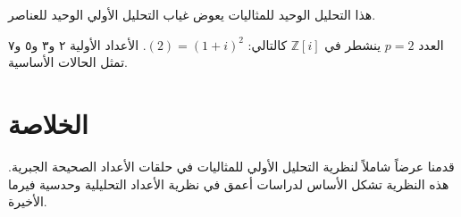 \documentclass{article}
\begin{document}
هذا التحليل الوحيد للمثاليات يعوض غياب التحليل الأولي الوحيد للعناصر.

العدد $p = 2$ ينشطر في $\mathbb{Z}[i]$ كالتالي: $(2) = (1+i)^2$.
الأعداد الأولية ٢ و٣ و٥ و٧ تمثل الحالات الأساسية.

\section{الخلاصة}

قدمنا عرضاً شاملاً لنظرية التحليل الأولي للمثاليات في حلقات الأعداد
الصحيحة الجبرية. هذه النظرية تشكل الأساس لدراسات أعمق في نظرية الأعداد
التحليلية وحدسية فيرما الأخيرة.
\end{document}
